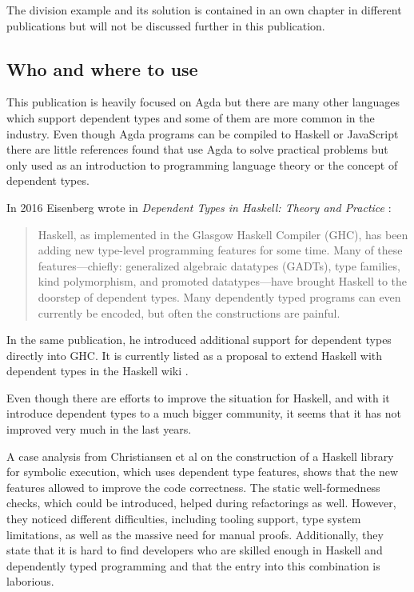 The division example and its solution is contained in an own chapter in different publications \cite{10.1145/2841316, Bove2009} but will not be discussed further in this publication.

\subsection{Who and where to use}
This publication is heavily focused on Agda but there are many other languages which support dependent types and some of them are more common in the industry.
Even though Agda programs can be compiled to Haskell or JavaScript there are little references found that use Agda to solve practical problems but only used as an introduction to programming language theory or the concept of dependent types.

In 2016 Eisenberg wrote in \emph{Dependent Types in Haskell: Theory and Practice} \cite{DBLP:journals/corr/Eisenberg16}: 
\begin{quote}
Haskell, as implemented in the Glasgow Haskell Compiler (GHC), has been adding new type-level programming features for some time. Many of these features---chiefly: generalized algebraic datatypes (GADTs), type families, kind polymorphism, and promoted datatypes---have brought Haskell to the doorstep of dependent types. Many dependently typed programs can even currently be encoded, but often the constructions are painful.
\end{quote}

In the same publication, he introduced additional support for dependent types directly into GHC. It is currently listed as a proposal to extend Haskell with dependent types in the Haskell wiki \cite{haskell_wiki}.

Even though there are efforts to improve the situation for Haskell, and with it introduce dependent types to a much bigger community, it seems that it has not improved very much in the last years.

A case analysis from Christiansen et al \cite{10.1145/3341704} on the construction of a Haskell library for symbolic execution, which uses dependent type features, shows that the new features allowed to improve the code correctness. The static well-formedness checks, which could be introduced, helped during refactorings as well. However, they noticed different difficulties, including tooling support, type system limitations, as well as the massive need for manual proofs. Additionally, they state that it is hard to find developers who are skilled enough in Haskell and dependently typed programming and that the entry into this combination is laborious.

